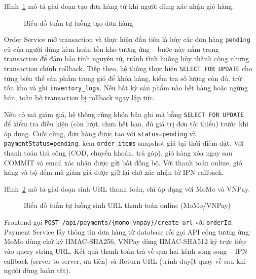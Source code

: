 \clearpage
Hình~\ref{fig:seq_checkout_create_order} mô tả giai đoạn tạo đơn hàng từ khi người dùng xác nhận giỏ hàng.

\begin{figure}[H]
  \centering
  \caption{Biểu đồ tuần tự luồng tạo đơn hàng}
  \label{fig:seq_checkout_create_order}
\end{figure}

\begin{sloppypar}
Order Service mở transaction và thực hiện đầu tiên là hủy các đơn hàng \texttt{pending} cũ của người dùng kèm hoàn tồn kho tương ứng -- bước này nằm trong transaction để đảm bảo tính nguyên tử, tránh tình huống hủy thành công nhưng transaction chính rollback. Tiếp theo, hệ thống thực hiện \texttt{SELECT FOR UPDATE} cho từng biến thể sản phẩm trong giỏ để khóa hàng, kiểm tra số lượng còn đủ, trừ tồn kho và ghi \texttt{inventory\_logs}. Nếu bất kỳ sản phẩm nào hết hàng hoặc ngừng bán, toàn bộ transaction bị rollback ngay lập tức.

Nếu có mã giảm giá, hệ thống cũng khóa bản ghi mã bằng \texttt{SELECT FOR UPDATE} để kiểm tra điều kiện (còn lượt, chưa hết hạn, đủ giá trị đơn tối thiểu) trước khi áp dụng. Cuối cùng, đơn hàng được tạo với \texttt{status=pending} và \linebreak[0]\texttt{paymentStatus=pending}, kèm \texttt{order\_items} snapshot giá tại thời điểm đặt. Với thanh toán thủ công (COD, chuyển khoản, trả góp), giỏ hàng xóa ngay sau COMMIT và email xác nhận được gửi bất đồng bộ. Với thanh toán online, giỏ hàng và bộ đếm mã giảm giá được giữ lại chờ xác nhận từ IPN callback.
\end{sloppypar}

\clearpage
\begin{sloppypar}
Hình~\ref{fig:seq_checkout_payment_url} mô tả giai đoạn sinh URL thanh toán, chỉ áp dụng với MoMo và VNPay.
\end{sloppypar}

\begin{figure}[H]
  \centering
  \caption{Biểu đồ tuần tự luồng sinh URL thanh toán online (MoMo\slash VNPay)}
  \label{fig:seq_checkout_payment_url}
\end{figure}

Frontend gọi \texttt{POST /api/payments/\{momo|vnpay\}/create-url} với \texttt{orderId}. Payment Service lấy thông tin đơn hàng từ database rồi gọi API cổng tương ứng: MoMo dùng chữ ký HMAC-SHA256, VNPay dùng HMAC-SHA512 ký trực tiếp vào query string URL. Kết quả thanh toán trả về qua hai kênh song song -- IPN callback (server-to-server, ưu tiên) và Return URL (trình duyệt quay về sau khi người dùng hoàn tất).

